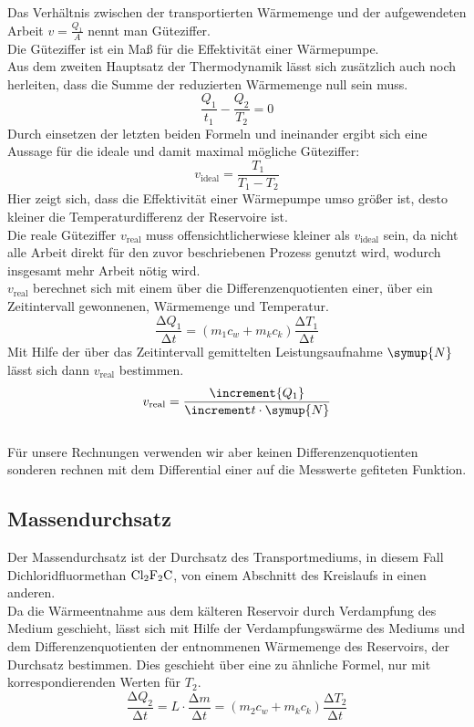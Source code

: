 Das Verhältnis zwischen der transportierten Wärmemenge und der 
aufgewendeten Arbeit $v=\frac{Q_1}{A}$ nennt man Güteziffer.\\
Die Güteziffer ist ein Maß für die Effektivität einer Wärmepumpe.\\
Aus dem zweiten Hauptsatz der Thermodynamik lässt sich zusätzlich auch noch herleiten,
dass die Summe der reduzierten Wärmemenge null sein muss.
\begin{equation}
    \frac{Q_1}{t_1}-\frac{Q_2}{T_2}=0
\end{equation}
Durch einsetzen der letzten beiden Formeln und  ineinander
ergibt sich eine Aussage für die ideale und damit maximal mögliche Güteziffer:
\begin{equation}
    v_\text{ideal}= \frac{T_1}{T_1-T_2}
    \label{eqn:videal}
\end{equation}
Hier zeigt sich, dass die Effektivität einer Wärmepumpe
umso größer ist, desto kleiner die Temperaturdifferenz der Reservoire ist. \\
Die reale Güteziffer $v_\text{real}$ muss offensichtlicherwiese
kleiner als $v_\text{ideal}$ sein, da nicht alle Arbeit direkt für den zuvor 
beschriebenen Prozess genutzt wird, wodurch insgesamt mehr Arbeit nötig wird.\\
$v_\text{real}$ berechnet sich mit einem über die Differenzenquotienten
einer, über ein Zeitintervall gewonnenen, Wärmemenge und Temperatur.
\begin{equation}
    \frac{\increment Q_1}{\increment t} = \left(m_1 c_w + m_k c_k \right)\frac{\increment T_1}{\increment t}
    \label{eqn:delQ}
\end{equation}
Mit Hilfe der über das Zeitintervall gemittelten Leistungsaufnahme $\symup{N}$
lässt sich dann $v_\text{real}$ bestimmen.
\begin{equation}
    v_\text{real}= \frac{\increment{Q_1}}{\increment t \cdot \symup{N} }
    \label{eqn:vreal1}
\end{equation}\\
Für unsere Rechnungen verwenden wir aber keinen Differenzenquotienten sonderen rechnen mit dem Differential
einer auf die Messwerte gefiteten Funktion.

\subsection{Massendurchsatz}

Der Massendurchsatz ist der Durchsatz des Transportmediums, in diesem Fall
Dichloridfluormethan $\ce{Cl2F2C}$, von einem Abschnitt des Kreislaufs in einen anderen.\\
Da die Wärmeentnahme aus dem kälteren Reservoir durch Verdampfung des Medium geschieht, 
lässt sich mit Hilfe der Verdampfungswärme des Mediums und dem Differenzenquotienten 
der entnommenen Wärmemenge des Reservoirs, der Durchsatz bestimmen.
Dies geschieht über eine zu  ähnliche Formel, nur mit korrespondierenden
Werten für $T_2$.
\begin{equation}
    \frac{\increment Q_2}{\increment t} = L\cdot \frac{\increment m}{\increment t}
    = \left(m_2 c_w + m_k c_k \right)\frac{\increment T_2}{\increment t}
\end{equation}

